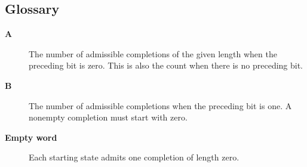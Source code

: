 \documentclass{article}
\theoremstyle{paperresult}
\begin{document}
\subsection*{Glossary}
\begin{description}
\item[{\normalfont\bfseries A}] The number of admissible completions of the given length when the preceding bit is zero. This is also the count when there is no preceding bit.
\item[{\normalfont\bfseries B}] The number of admissible completions when the preceding bit is one. A nonempty completion must start with zero.
\item[{\normalfont\bfseries Empty word}] Each starting state admits one completion of length zero.
\end{description}
\end{document}
